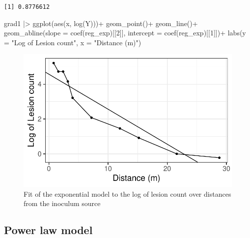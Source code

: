 \documentclass[
  letterpaper,
  DIV=11,
  numbers=noendperiod]{scrreprt}
\newenvironment{Shaded}{\begin{snugshade}}{\end{snugshade}}
\newcommand{\AttributeTok}[1]{\textcolor[rgb]{0.40,0.45,0.13}{#1}}
\newcommand{\DecValTok}[1]{\textcolor[rgb]{0.68,0.00,0.00}{#1}}
\newcommand{\FunctionTok}[1]{\textcolor[rgb]{0.28,0.35,0.67}{#1}}
\newcommand{\NormalTok}[1]{\textcolor[rgb]{0.00,0.23,0.31}{#1}}
\newcommand{\SpecialCharTok}[1]{\textcolor[rgb]{0.37,0.37,0.37}{#1}}
\newcommand{\StringTok}[1]{\textcolor[rgb]{0.13,0.47,0.30}{#1}}
\begin{document}
\begin{verbatim}
[1] 0.8776612
\end{verbatim}

\begin{Shaded}
\begin{Highlighting}[]
\NormalTok{grad1 }\SpecialCharTok{|\textgreater{}} 
  \FunctionTok{ggplot}\NormalTok{(}\FunctionTok{aes}\NormalTok{(x, }\FunctionTok{log}\NormalTok{(Y)))}\SpecialCharTok{+}
  \FunctionTok{geom\_point}\NormalTok{()}\SpecialCharTok{+}
  \FunctionTok{geom\_line}\NormalTok{()}\SpecialCharTok{+}
  \FunctionTok{geom\_abline}\NormalTok{(}\AttributeTok{slope =} \FunctionTok{coef}\NormalTok{(reg\_exp)[[}\DecValTok{2}\NormalTok{]], }\AttributeTok{intercept =} \FunctionTok{coef}\NormalTok{(reg\_exp)[[}\DecValTok{1}\NormalTok{]])}\SpecialCharTok{+}
 \FunctionTok{labs}\NormalTok{(}\AttributeTok{y =} \StringTok{"Log of Lesion count"}\NormalTok{,}
       \AttributeTok{x =} \StringTok{"Distance (m)"}\NormalTok{)}
\end{Highlighting}
\end{Shaded}

\begin{figure}[H]

{\centering \includegraphics{spatial-fitting_files/figure-pdf/fig-fit_grad2-1.pdf}

}

\caption{\label{fig-fit_grad2}Fit of the exponential model to the log of
lesion count over distances from the inoculum source}

\end{figure}

\hypertarget{power-law-model-1}{%
\subsection{Power law model}\label{power-law-model-1}}
\end{document}
